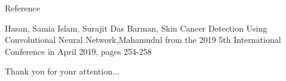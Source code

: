 \documentclass{beamer}
\begin{document}
\begin{frame}{Reference}
\par [1] Hasan, Samia Islam, Surajit Das Barman, Skin Cancer Detection Using Convolutional Neural Network,Mahamudul from the 2019 5th International Conference in April 2019, pages 254-258
\end{frame}

\begin{frame}
  \begin{block}{}
  \centering
  Thank you for your attention...
  \end{block}
\end{frame}
\end{document}
